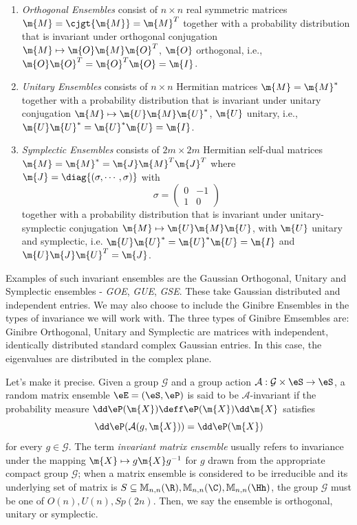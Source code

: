 \begin{enumerate}
	\item \textit{Orthogonal Ensembles} consist of $n \times n$ real symmetric matrices $\m{M} = \cjgt{\m{M}} = \m{M}^T$ together with a probability distribution that is invariant under orthogonal conjugation $\m{M} \mapsto \m{O} \m{M} \m{O}^T$, $\m{O}$ orthogonal, i.e., $\m{O} \m{O}^T = \m{O}^T \m{O} = \m{I}$.  
	\item \textit{Unitary Ensembles} consists of $n \times n$ Hermitian matrices $\m{M} = \m{M}^*$ together with a probability distribution that is invariant under unitary conjugation $\m{M} \mapsto \m{U} \m{M} \m{U}^*$, $\m{U}$ unitary, i.e., $\m{U} \m{U}^* = \m{U}^* \m{U} = \m{I}$.  
	\item \textit{Symplectic Ensembles} consists of $2m \times 2m$ Hermitian self-dual matrices $\m{M} = \m{M}^* = \m{J} \m{M}^T \m{J}^T$ where $\m{J} = \diag{(\sigma, \cdots, \sigma)}$ with $$\sigma = \begin{pmatrix} 0 & -1\\	1 & 0 \end{pmatrix}$$  together with a probability distribution that is invariant under unitary-symplectic conjugation $\m{M} \mapsto \m{U} \m{M} \m{U}$, with $\m{U}$ unitary and symplectic, i.e. $\m{U} \m{U}^* = \m{U}^* \m{U} = \m{I}$ and $\m{U} \m{J} \m{U}^T = \m{J}$.
\end{enumerate}

Examples of such invariant ensembles are the Gaussian Orthogonal, Unitary and Symplectic ensembles - \textit{GOE}, \textit{GUE}, \textit{GSE}. These take Gaussian distributed and independent entries. We may also choose to include the Ginibre Ensembles in the types of invariance we will work with. The three types of Ginibre Emsembles are: Ginibre Orthogonal, Unitary and Symplectic are matrices with independent, identically distributed standard complex Gaussian entries. In this case, the eigenvalues are distributed in the complex plane. 

Let's make it precise. Given a group $\mathcal{G}$ and a group action $\mathcal{A}: \mathcal{G}\times \eS \rightarrow \eS$, a random matrix ensemble $\eE = (\eS, \eP)$ is said to be $\mathcal{A}$-invariant if the probability measure $\dd \eP(\m{X}) \deff \eP(\m{X}) \dd \m{X}$ satisfies
\begin{equation}
	\dd \eP(\mathcal{A}(g, \m{X})) = \dd \eP(\m{X})
\end{equation}
for every $g \in \mathcal{G}$. The term \textit{invariant matrix ensemble} usually refers to invariance under the mapping $\m{X} \mapsto g\m{X}g^{-1}$ for $g$ drawn from the appropriate compact group $\mathcal{G}$; when a matrix ensemble is considered to be irreducible and its underlying set of matrix is $S \subseteq \mathbb{M}_{n,n}(\R), \mathbb{M}_{n,n}(\C), \mathbb{M}_{n,n}(\Hh)$, the group $\mathcal{G}$ must be one of $O(n), U(n), Sp(2n)$. Then, we say the ensemble is orthogonal, unitary or symplectic.

